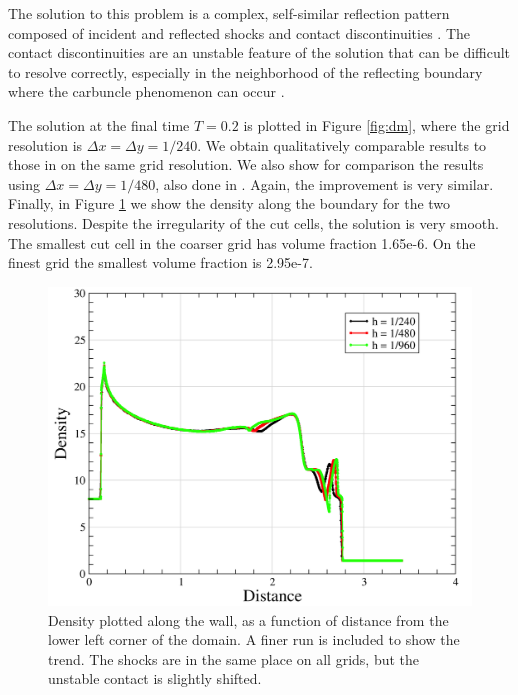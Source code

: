 The solution to this problem is a complex, self-similar reflection pattern 
composed of incident and reflected shocks and contact 
discontinuities \cite{WOODWARD1984115,rkdg5}.  
The contact discontinuities are an unstable feature of the solution that can be 
difficult to resolve correctly, especially in the neighborhood of the 
reflecting boundary where the carbuncle phenomenon can occur \cite{KEMM2018596}.

The solution at the final time $T = 0.2$ is plotted in Figure \ref{fig:dm}, 
where the grid resolution is $\Delta x = \Delta y = 1/240$.
We obtain qualitatively comparable results to those in \cite{rkdg5} on 
the same grid resolution. We also show for comparison the results using 
$\Delta x = \Delta y = 1/480$, also done in \cite{rkdg5}. Again, the
improvement is very similar. Finally, in Figure \ref{fig:wedgeBndry} we
show the density along the boundary for the two resolutions. Despite the
irregularity of the cut cells, the solution is very smooth. The smallest
cut cell in the coarser grid has volume fraction 1.65e-6. On the finest
grid the smallest volume fraction is 2.95e-7. 

\begin{figure}[h]
\centering
\includegraphics[width=.7\linewidth]{figs/rampWall3.png}
\caption{\sf Density plotted along the wall, as a function of distance from
the lower left corner of the domain.  A finer run is included to show
the trend. The shocks are in the same place on all grids, but the 
unstable contact is slightly shifted.
} \label{fig:wedgeBndry}
\end{figure}


